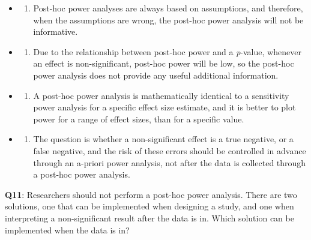 \documentclass[
  letterpaper,
  DIV=11,
  numbers=noendperiod]{scrreprt}
\providecommand{\tightlist}{%
  \setlength{\itemsep}{0pt}\setlength{\parskip}{0pt}}\usepackage{longtable,booktabs,array}
\begin{document}
\begin{itemize}
\item
  \begin{enumerate}
  \def\labelenumi{(\Alph{enumi})}
  \tightlist
  \item
    Post-hoc power analyses are always based on assumptions, and
    therefore, when the assumptions are wrong, the post-hoc power
    analysis will not be informative.\\
  \end{enumerate}
\item
  \begin{enumerate}
  \def\labelenumi{(\Alph{enumi})}
  \setcounter{enumi}{1}
  \tightlist
  \item
    Due to the relationship between post-hoc power and a \emph{p}-value,
    whenever an effect is non-significant, post-hoc power will be low,
    so the post-hoc power analysis does not provide any useful
    additional information.\\
  \end{enumerate}
\item
  \begin{enumerate}
  \def\labelenumi{(\Alph{enumi})}
  \setcounter{enumi}{2}
  \tightlist
  \item
    A post-hoc power analysis is mathematically identical to a
    sensitivity power analysis for a specific effect size estimate, and
    it is better to plot power for a range of effect sizes, than for a
    specific value.\\
  \end{enumerate}
\item
  \begin{enumerate}
  \def\labelenumi{(\Alph{enumi})}
  \setcounter{enumi}{3}
  \tightlist
  \item
    The question is whether a non-significant effect is a true negative,
    or a false negative, and the risk of these errors should be
    controlled in advance through an a-priori power analysis, not after
    the data is collected through a post-hoc power analysis.\\
  \end{enumerate}
\end{itemize}

\textbf{Q11}: Researchers should not perform a post-hoc power analysis.
There are two solutions, one that can be implemented when designing a
study, and one when interpreting a non-significant result after the data
is in. Which solution can be implemented when the data is in?
\end{document}
